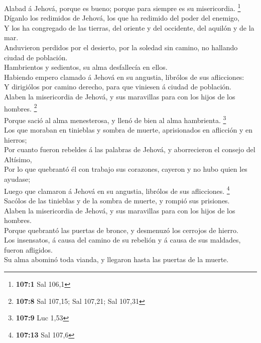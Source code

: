 Alabad á Jehová, porque es bueno; porque para siempre es
su misericordia. \footnote{\textbf{107:1} Sal 106,1}\\
 Díganlo los redimidos de Jehová, los que ha redimido del
poder del enemigo,\\
 Y los ha congregado de las tierras, del oriente y del
occidente, del aquilón y de la mar.\\
 Anduvieron perdidos por el desierto, por la soledad sin
camino, no hallando ciudad de población.\\
 Hambrientos y sedientos, su alma desfallecía en ellos.\\
 Habiendo empero clamado á Jehová en su angustia, librólos
de sus aflicciones:\\
 Y dirigiólos por camino derecho, para que viniesen á
ciudad de población.\\
 Alaben la misericordia de Jehová, y sus maravillas para
con los hijos de los hombres. \footnote{\textbf{107:8} Sal 107,15; Sal
  107,21; Sal 107,31}\\
 Porque sació al alma menesterosa, y llenó de bien al alma
hambrienta. \footnote{\textbf{107:9} Luc 1,53}\\
 Los que moraban en tinieblas y sombra de muerte,
aprisionados en aflicción y en hierros;\\
 Por cuanto fueron rebeldes á las palabras de Jehová, y
aborrecieron el consejo del Altísimo,\\
 Por lo que quebrantó él con trabajo sus corazones,
cayeron y no hubo quien les ayudase;\\
 Luego que clamaron á Jehová en su angustia, librólos de
sus aflicciones. \footnote{\textbf{107:13} Sal 107,6}\\
 Sacólos de las tinieblas y de la sombra de muerte, y
rompió sus prisiones.\\
 Alaben la misericordia de Jehová, y sus maravillas para
con los hijos de los hombres.\\
 Porque quebrantó las puertas de bronce, y desmenuzó los
cerrojos de hierro.\\
 Los insensatos, á causa del camino de su rebelión y á
causa de sus maldades, fueron afligidos.\\
 Su alma abominó toda vianda, y llegaron hasta las
puertas de la muerte.\\
